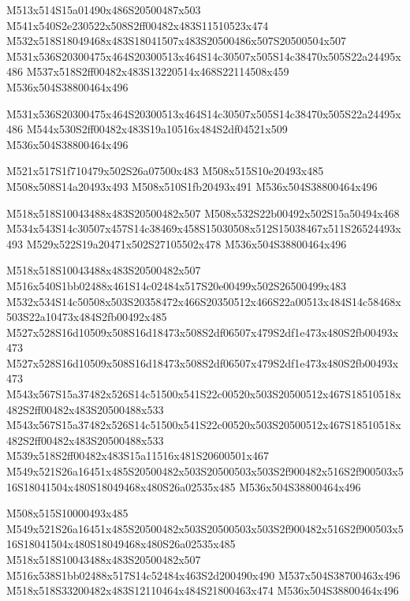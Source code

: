 \documentclass{article}
\begin{document}
\begin{multicols}{5}
\begin{center}
M513x514S15a01490x486S20500487x503 %
M541x540S2e230522x508S2ff00482x483S11510523x474 %
M532x518S18049468x483S18041507x483S20500486x507S20500504x507 %
M531x536S20300475x464S20300513x464S14c30507x505S14c38470x505S22a24495x486 %
M537x518S2ff00482x483S13220514x468S22114508x459 %
M536x504S38800464x496 %

M531x536S20300475x464S20300513x464S14c30507x505S14c38470x505S22a24495x486 %
M544x530S2ff00482x483S19a10516x484S2df04521x509 %
M536x504S38800464x496 %

M521x517S1f710479x502S26a07500x483 %
M508x515S10e20493x485 %
M508x508S14a20493x493 %
M508x510S1fb20493x491 %
M536x504S38800464x496 %

M518x518S10043488x483S20500482x507 %
M508x532S22b00492x502S15a50494x468 %
M534x543S14c30507x457S14c38469x458S15030508x512S15038467x511S26524493x493 %
M529x522S19a20471x502S27105502x478 %
M536x504S38800464x496 %

M518x518S10043488x483S20500482x507 %
M516x540S1bb02488x461S14c02484x517S20e00499x502S26500499x483 %
M532x534S14c50508x503S20358472x466S20350512x466S22a00513x484S14c58468x503S22a10473x484S2fb00492x485 %
M527x528S16d10509x508S16d18473x508S2df06507x479S2df1e473x480S2fb00493x473 %
M527x528S16d10509x508S16d18473x508S2df06507x479S2df1e473x480S2fb00493x473 %
M543x567S15a37482x526S14c51500x541S22c00520x503S20500512x467S18510518x482S2ff00482x483S20500488x533 %
M543x567S15a37482x526S14c51500x541S22c00520x503S20500512x467S18510518x482S2ff00482x483S20500488x533 %
M539x518S2ff00482x483S15a11516x481S20600501x467 %
M549x521S26a16451x485S20500482x503S20500503x503S2f900482x516S2f900503x516S18041504x480S18049468x480S26a02535x485 %
M536x504S38800464x496 %

M508x515S10000493x485 %
M549x521S26a16451x485S20500482x503S20500503x503S2f900482x516S2f900503x516S18041504x480S18049468x480S26a02535x485 %
M518x518S10043488x483S20500482x507 %
M516x538S1bb02488x517S14c52484x463S2d200490x490 %
M537x504S38700463x496 %
M518x518S33200482x483S12110464x484S21800463x474 %
M536x504S38800464x496 %

\end{center}
\end{multicols}
\end{document}
